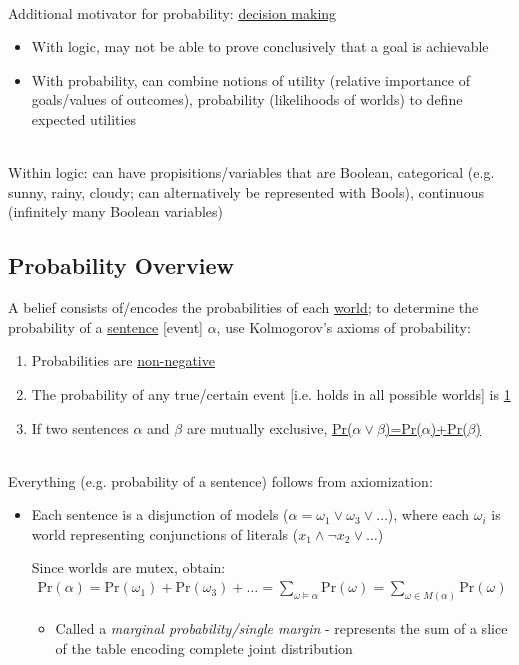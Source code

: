 \documentclass[12pt]{extarticle}
\theoremstyle{definition}
\theoremstyle{remark}
\newcommand{\pstart}[0]{\noindent}
\newcommand{\newp}[0]{~\\ \pstart}
\newcommand{\prob}[1]{\text{Pr}(#1)}
\begin{document}
\newp
Additional motivator for probability: \ul{decision making} \begin{itemize}
    \item With logic, may not be able to prove conclusively that a goal is achievable
    \item With probability, can combine notions of utility (relative importance of goals/values of outcomes), probability (likelihoods of worlds) to define expected utilities
\end{itemize}

\newp
Within logic: can have propisitions/variables that are Boolean, categorical (e.g. sunny, rainy, cloudy; can alternatively be represented with Bools), continuous (infinitely many Boolean variables)

\subsection{Probability Overview}
\pstart
A belief consists of/encodes the probabilities of each \ul{world}; to determine the probability of a \ul{sentence} [event] $\alpha$, use Kolmogorov's axioms of probability: \begin{enumerate}
    \item Probabilities are \ul{non-negative}
    \item The probability of any true/certain event [i.e. holds in all possible worlds] is \ul{1}
    \item If two sentences $\alpha$ and $\beta$ are mutually exclusive, \ul{Pr($\alpha\lor\beta$)=Pr($\alpha$)+Pr($\beta$)}
\end{enumerate}

\newp
Everything (e.g. probability of a sentence) follows from axiomization: \begin{itemize}
    \item Each sentence is a disjunction of models ($\alpha=\omega_1\lor\omega_3\lor\hdots$), where each $\omega_i$ is world representing conjunctions of literals ($x_1\land\neg x_2\lor\hdots$)
    
    Since worlds are mutex, obtain: \begin{align*}
        \prob{\alpha}=\prob{\omega_1}+\prob{\omega_3}+\hdots=\sum_{\omega\models\alpha}\prob{\omega}=\sum_{\omega\in M(\alpha)}\prob{\omega}
    \end{align*}\begin{itemize}
        \item Called a \textit{marginal probability/single margin} - represents the sum of a slice of the table encoding complete joint distribution
    \end{itemize}
\end{itemize}
\end{document}
